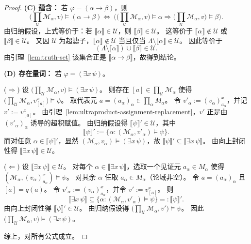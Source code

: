 \documentclass[lang=cn,a4paper,newtx,section]{elegantbook}
\begin{document}
\begin{proof}
\textbf{(C) 蕴含：}
若 $\varphi=(\alpha\to\beta)$，则
\[
  \bigl(\prod_{\mathcal U}\mathcal M_{\alpha},v\bigr)\models(\alpha\to\beta)
  \Longleftrightarrow\ \bigl(\bigl(\prod_{\mathcal U}\mathcal M_{\alpha},v\bigr)\models\alpha\Rightarrow\bigl(\prod_{\mathcal U}\mathcal M_{\alpha},v\bigr)\models\beta\bigr).
\]
由归纳假设，上式等价于：若 $\llbracket\alpha\rrbracket\in\mathcal U$，则 $\llbracket\beta\rrbracket\in\mathcal U$。
这等价于 $\llbracket\alpha\rrbracket\notin\mathcal U$ 或 $\llbracket\beta\rrbracket\in\mathcal U$。
又因 $\mathcal U$ 为超滤子，$\llbracket\alpha\rrbracket\notin\mathcal U$ 当且仅当 $\Lambda\setminus\llbracket\alpha\rrbracket\in\mathcal U$。
因此等价于
\[
  (\Lambda\setminus\llbracket\alpha\rrbracket)\cup\llbracket\beta\rrbracket\in\mathcal U.
\]
由引理~\ref{lem:truth-set} 该集合正是 $\llbracket\alpha\to\beta\rrbracket$，故得到结论。

\textbf{(D) 存在量词：}
若 $\varphi=(\exists x\,\psi)$。

($\Rightarrow$) 设 $\bigl(\prod_{\mathcal U}\mathcal M_{\alpha},v\bigr)\models(\exists x\,\psi)$。
则存在 $[a]\in\prod_{\mathcal U}\mathcal M_{\alpha}$ 使得 $\bigl(\prod_{\mathcal U}\mathcal M_{\alpha},v^{x}_{[a]}\bigr)\models\psi$。
取代表元 $a=(a_{\alpha})_{\alpha}\in\prod_{\alpha}M_{\alpha}$。
令 $v'_{\alpha}:=(v_{\alpha})^{x}_{a_{\alpha}}$，并记 $v':=v^{x}_{[a]}$。
由引理~\ref{lem:ultraproduct-assignment-replacement}，$v'$ 正是由 $(v'_{\alpha})_{\alpha}$ 诱导的超积赋值。
由归纳假设得 $\llbracket\psi\rrbracket'\in\mathcal U$，其中
\[
  \llbracket\psi\rrbracket':=\{\alpha:(\mathcal M_{\alpha},v'_{\alpha})\models\psi\}.
\]
而对任意 $\alpha\in\llbracket\psi\rrbracket'$，显然 $(\mathcal M_{\alpha},v_{\alpha})\models(\exists x\,\psi)$，故
$\llbracket\psi\rrbracket'\subseteq\llbracket\exists x\,\psi\rrbracket$。
由向上封闭性得 $\llbracket\exists x\,\psi\rrbracket\in\mathcal U$。

($\Leftarrow$) 设 $\llbracket\exists x\,\psi\rrbracket\in\mathcal U$。
对每个 $\alpha\in\llbracket\exists x\,\psi\rrbracket$，选取一个见证元 $a_{\alpha}\in M_{\alpha}$ 使得 $(\mathcal M_{\alpha},(v_{\alpha})^{x}_{a_{\alpha}})\models\psi$。
对其余 $\alpha$ 任取 $a_{\alpha}\in M_{\alpha}$（论域非空）。
令 $a=(a_{\alpha})_{\alpha}$ 且 $[a]=q(a)$。
令 $v'_{\alpha}:=(v_{\alpha})^{x}_{a_{\alpha}}$，并令 $v':=v^{x}_{[a]}$。
则
\[
  \llbracket\exists x\,\psi\rrbracket\subseteq\{\alpha:(\mathcal M_{\alpha},v'_{\alpha})\models\psi\}=:\llbracket\psi\rrbracket'.
\]
由向上封闭性得 $\llbracket\psi\rrbracket'\in\mathcal U$。
由归纳假设得 $\bigl(\prod_{\mathcal U}\mathcal M_{\alpha},v'\bigr)\models\psi$。
 因此 $\bigl(\prod_{\mathcal U}\mathcal M_{\alpha},v\bigr)\models(\exists x\,\psi)$。

 综上，对所有公式成立。
\end{proof}
\end{document}

